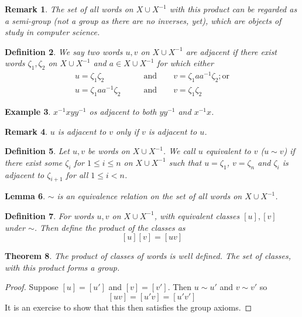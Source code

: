 \documentclass[a4paper,10pt]{article}
\newtheorem{thm}{Theorem}
\newtheorem{Def}[thm]{Definition}
\newtheorem{eg}[thm]{Example}
\newtheorem{Lem}[thm]{Lemma}
\newtheorem{rem}[thm]{Remark}
\begin{document}
\begin{rem}
The set of all words on $X \cup X^{-1}$ with this product can be regarded as a semi-group (not a group as there are no inverses, yet), which are objects of study in computer science. 
\end{rem}

\begin{Def}
We say two words $u,v$ on $X \cup X^{-1}$ are adjacent if there exist words $\zeta_1, \zeta_2$ on $X \cup X^{-1}$ and $a \in X \cup X^{-1}$ for which either
\begin{align}
u = \zeta_1 \zeta_2 \qquad &\text{and} \qquad v = \zeta_1 a a^{-1} \zeta_2; \text{or} \\
u = \zeta_1 a a^{-1} \zeta_2 \qquad &\text{and} \qquad v = \zeta_1 \zeta_2 
\end{align}
\end{Def}

\begin{eg}
$x^{-1} x y y^{-1}$ os adjacent to both $yy^{-1}$ and $x^{-1} x$.
\end{eg}

\begin{rem}
$u$ is adjacent to $v$ only if $v$ is adjacent to $u$. 
\end{rem}

\begin{Def}
Let $u,v$ be words on $X \cup X^{-1}$. We call $u$ equivalent to $v$ ($u \sim v$) if there exist some $\zeta_i$ for $1 \leq i \leq n$ on $X \cup X^{-1}$ such that $u = \zeta_1$, $v = \zeta_n$ and $\zeta_i$ is adjacent to $\zeta_{i+1}$ for all $1 \leq i < n$. 
\end{Def}

\begin{Lem}
$\sim$ is an equivalence relation on the set of all words on $X \cup X^{-1}$.
\end{Lem}

\begin{Def}
For words $u, v$ on $X \cup X^{-1}$, with equivalent classes $[u], [v]$ under $\sim$. Then define the product of the classes as
\[ [u] [v] = [uv] \]
\end{Def}

\begin{thm}
The product of classes of words is well defined. The set of classes, with this product forms a group. 
\end{thm}

\begin{proof}
Suppose $[u] = [u']$ and $[v] = [v']$. Then $u \sim u'$ and $v \sim v'$ so 
\[ [uv] = [u'v] = [u'v'] \]
It is an exercise to show that this then satisfies the group axioms.
\end{proof}
\end{document}
